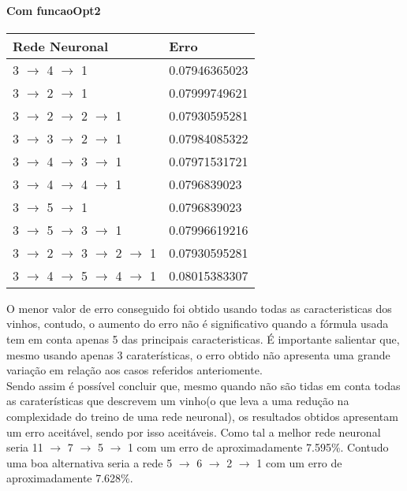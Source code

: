 \documentclass{article}
\begin{document}
\paragraph{Com funcaoOpt2}
\begin{center}
\begin{tabular}{ | l | l | }
\hline
Rede Neuronal & Erro\\ \hline
3 $\to$ 4 $\to$ 1 & 0.07946365023\\ \hline
3 $\to$ 2 $\to$ 1 & 0.07999749621\\ \hline
3 $\to$ 2 $\to$ 2 $\to$ 1 & 0.07930595281\\ \hline
3 $\to$ 3 $\to$ 2 $\to$ 1 & 0.07984085322\\ \hline
3 $\to$ 4 $\to$ 3 $\to$ 1 & 0.07971531721\\ \hline
3 $\to$ 4 $\to$ 4 $\to$ 1 & 0.0796839023\\ \hline
3 $\to$ 5 $\to$ 1 & 0.0796839023\\ \hline
3 $\to$ 5 $\to$ 3 $\to$ 1 & 0.07996619216\\ \hline
3 $\to$ 2 $\to$ 3 $\to$ 2 $\to$ 1 & 0.07930595281\\ \hline
3 $\to$ 4 $\to$ 5 $\to$ 4 $\to$ 1 & 0.08015383307\\ \hline
\end{tabular}
\end{center}

O menor valor de erro conseguido foi obtido usando todas as caracteristicas dos vinhos, contudo, o aumento do erro não é significativo quando a fórmula usada tem em conta apenas 5 das principais caracteristicas. É importante salientar que, mesmo usando apenas 3 caraterísticas, o erro obtido não apresenta uma grande variação em relação aos casos referidos anteriomente.\\
Sendo assim é possível concluir que, mesmo quando não são tidas em conta todas as caraterísticas que descrevem um vinho(o que leva a uma redução na complexidade do treino de uma rede neuronal), os resultados obtidos apresentam um erro aceitável, sendo por isso aceitáveis.
Como tal a melhor rede neuronal seria 11 $\to$ 7 $\to$ 5 $\to$ 1 com um erro de aproximadamente 7.595\%. Contudo uma boa alternativa seria a rede 5 $\to$ 6 $\to$ 2 $\to$ 1 com um erro de aproximadamente 7.628\%.

\newpage

\vspace*{\fill}
\end{document}
